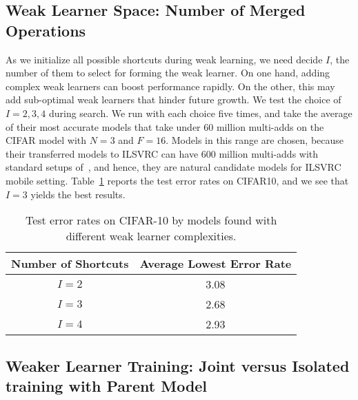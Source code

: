 \subsection{Weak Learner Space: Number of Merged Operations}
\label{sec:experiment_number_operations}
As we initialize all possible shortcuts during weak learning, we need decide $I$, the number of them to select for forming the weak learner. On one hand, adding complex weak learners can boost performance rapidly. On the other, this may add sub-optimal weak learners that hinder future growth. We test the choice of $I=2,3,4$ during search. We run with each choice five times, and take the average of their most accurate models that take under 60 million multi-adds on the CIFAR model with $N=3$ and $F=16$. Models in this range are chosen, because their transferred models to ILSVRC can have 600 million multi-adds with standard setups of~\citep{NASCell}, and hence, they are natural candidate models for ILSVRC mobile setting. Table~\ref{tab:cifar10_search_choose_i} reports the test error rates on CIFAR10, and we see that $I=3$ yields the best results. 



\begin{table}[t]
    \centering
    \caption{Test error rates on CIFAR-10 by models found with different weak learner complexities.
    }
    \begin{tabular}{c|c}
    \hline
    Number of Shortcuts & Average Lowest Error Rate \\
    \hline
    $I=2$ & 3.08  \\ %
    $I=3$ & 2.68 \\  %
    $I=4$ & 2.93 \\ %
    \hline
    \end{tabular}
    \label{tab:cifar10_search_choose_i}
\end{table}


\subsection{Weaker Learner Training: Joint versus Isolated training with Parent Model}
\label{sec:experiment_soft_vs_hard}

